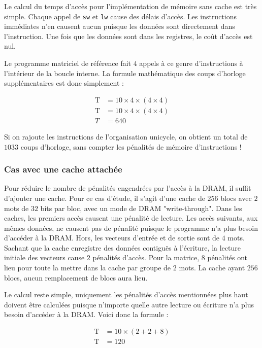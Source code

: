 \documentclass[a11paper]{article}
\begin{document}
Le calcul du temps d’accès pour l’implémentation de mémoire sans cache est très
simple. Chaque appel de \verb|sw| et \verb|lw| cause des délais d’accès.
Les instructions immédiates n’en causent aucun puisque les données sont
directement dans l’instruction. Une fois que les données sont dans les registres,
le coût d’accès est nul.

Le programme matriciel de référence fait $4$ appels à ce genre
d’instructions à l’intérieur de la boucle interne. La formule mathématique
des coups d’horloge supplémentaires est donc simplement :

\begin{align}
  \text{T} &= 10\times4\times(4\times4) \\
  \text{T} &= 10\times4\times(4\times4) \\
  T        &= 640
\end{align}

Si on rajoute les instructions de l'organisation unicycle, on obtient un
total de $1033$ coups d'horloge, sans compter les pénalités de mémoire
d'instructions !

\subsubsection{Cas avec une cache attachée}

Pour réduire le nombre de pénalités engendrées par l'accès à la DRAM, il
suffit d'ajouter une cache. Pour ce cas d'étude, il s'agit d'une cache de $256$ blocs
avec $2$ mots de $32$ bits par bloc, avec un mode de DRAM "write-through".
Dans les caches, les premiers accès causent une pénalité de lecture. Les accès
suivants, aux mêmes données, ne causent pas de pénalité puisque le programme n'a
plus besoin d'accéder à la DRAM. Hors, les vecteurs d'entrée et de sortie sont
de $4$ mots. Sachant que la cache enregistre des données contiguës à l'écriture,
la lecture initiale des vecteurs cause $2$ pénalités d'accès.
Pour la matrice, $8$ pénalités ont lieu pour toute la mettre dans la cache par
groupe de $2$ mots. La cache ayant $256$ blocs, aucun remplacement de blocs
aura lieu.

Le calcul reste simple, uniquement les pénalités d'accès mentionnées plus haut
doivent être calculées puisque n'importe quelle autre lecture ou écriture
n'a plus besoin d'accéder à la DRAM. Voici donc la formule :

\begin{align}
  \text{T} &= 10\times(2+2+8) \\
  \text{T} &= 120
\end{align}
\end{document}
